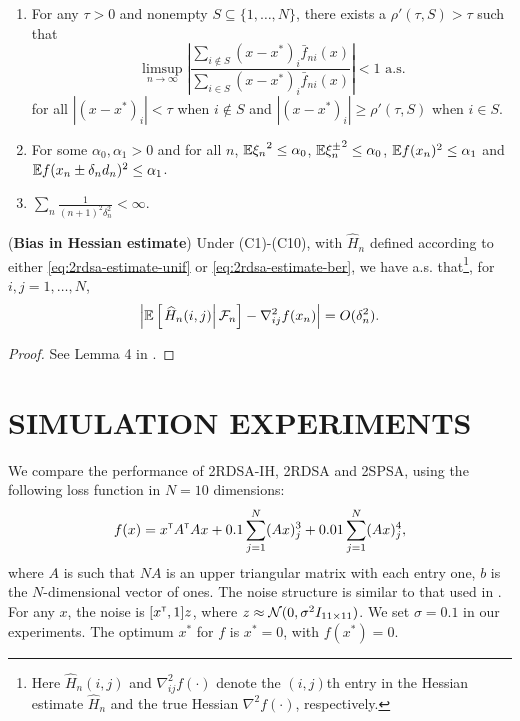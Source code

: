 \documentclass[letterpaper, 10 pt, conference]{ieeeconf}  %
\begin{document}
\begin{enumerate}[label=(\textbf{C\arabic*})]
\item For any $\tau >0$ and nonempty $S \subseteq \{1,\ldots,N\}$, there exists a $\rho'(\tau,S)>\tau$ such that 
$$ \limsup_{n\rightarrow \infty} \left| \dfrac{\sum_{i \notin S} (x-x^*)_i \bar f_{ni}(x)}{\sum_{i \in S} (x-x^*)_i \bar f_{ni}(x)}               \right| < 1 \text{ a.s.}$$
for all $|(x-x^*)_i| < \tau$ when $i \notin S$ and $|(x-x^*)_i| \ge \rho'(\tau,S)$ when $i\in S$.
\item For some $\alpha_0, \alpha_1>0$ and for all $n$, $\mathbb{E} {\xi_n}^{2} \le \alpha_0$, $\mathbb{E} {\xi_n^{\pm}}^{2} \le \alpha_0$, $\mathbb{E} f(x_n)^{2} \le \alpha_1$ and $\mathbb{E} f(x_n\pm \delta_n d_n)^{2} \le \alpha_1$. 
\item  $\sum_n \frac{1}{(n+1)^{2}\delta_n^{2}} < \infty$.
\end{enumerate}
\begin{lemma}(\textbf{Bias in Hessian estimate})
\label{lemma:2rdsa-bias}
Under (C1)-(C10), with $\widehat H_n$ defined according to either \eqref{eq:2rdsa-estimate-unif} or \eqref{eq:2rdsa-estimate-ber}, we have a.s. that\footnote{Here $\widehat H_n(i,j)$ and $\nabla^2_{ij}f(\cdot)$ denote the $(i,j)$th entry in the Hessian estimate $\widehat H_n$ and the true Hessian $\nabla^2 f(\cdot)$, respectively.}, for $i,j = 1,\ldots,N$,
\begin{align}
\left|\mathbb{E}\left[
\left. \widehat H_n(i,j) \right| \mathcal{F}_n \right] - \nabla^2_{ij} f(x_n)\right| = O(\delta_n^2).
\end{align} 
\end{lemma}
\begin{proof}
See Lemma 4 in \cite{prashanth2015rdsa}.
\end{proof}


\section{SIMULATION EXPERIMENTS}
\label{sec:expts}
We compare the performance of 2RDSA-IH, 2RDSA and 2SPSA, using the following loss function in $N=10$ dimensions:
\begin{align} 
f(x) = x^\mathsf{\scriptscriptstyle T} A^\mathsf{\scriptscriptstyle T} A x + 0.1 \sum_{j=1}^N (Ax)^3_j + 0.01 \sum_{j=1}^N (Ax)^4_j,\label{eq:4thorder}
 \end{align} 
where $A$ is such that $NA$ is an upper triangular matrix with each entry one, $b$ is the $N$-dimensional vector of ones. The noise structure is similar to that used in \cite{spall_adaptive}. For any $x$, the noise is $[x^\mathsf{\scriptscriptstyle T}, 1]z$, where $z \approx \mathcal{N}(0,\sigma^2 I_{11\times11})$. We set $\sigma=0.1$ in our experiments. The optimum $x^*$ for $f$ is $x^*=0$, with $f(x^*) = 0$. 
\end{document}

